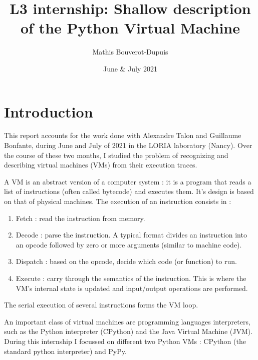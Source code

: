 \documentclass[french]{article}
\begin{document}
	\title{L3 internship: Shallow description of the Python Virtual Machine}
	\author{Mathis Bouverot-Dupuis}
	\date{June \& July 2021}
	
	\maketitle 
	
	\tableofcontents
	\newpage

\section{Introduction}
This report accounts for the work done with Alexandre Talon and Guillaume Bonfante, during June and July of 2021 in the LORIA laboratory (Nancy). Over the course of these two months, I studied the problem of recognizing and describing virtual machines (VMs) from their execution traces.

A VM is an abstract version of a computer system : it is a program that reads a list of instructions (often called bytecode) and executes them. It's design is based on that of physical machines. The execution of an instruction consists in :
\begin{enumerate}
	\item Fetch : read the instruction from memory.
	\item Decode : parse the instruction. A typical format divides an instruction into an opcode followed by zero or more arguments (similar to machine code).
	\item Dispatch : based on the opcode, decide which code (or function) to run.
	\item Execute : carry through the semantics of the instruction. This is where the VM's internal state is updated and input/output operations are performed.
\end{enumerate}
The serial execution of several instructions forms the VM loop.


An important class of virtual machines are programming languages interpreters, such as the Python interpreter (CPython) and the Java Virtual Machine (JVM). During this internship I focussed on different two Python VMs : CPython (the standard python interpreter) and PyPy. 


\end{document}
